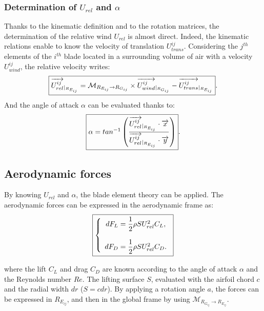 \subsubsection*{Determination of $U_{rel}$ and $\alpha$}
Thanks to the kinematic definition and to the rotation matrices, the determination of the relative wind $U_{rel}$ is almost direct. Indeed, the kinematic relations enable to know the velocity of translation $U^{ij}_{trans}$. Considering the $j^{th}$ elements of the $i^{th}$ blade located in a surrounding volume of air with a velocity $U^{ij}_{wind}$, the relative velocity writes:
\begin{equation}
\label{eq:AL_urel}
\fbox{$
\overrightarrow{U^{ij}_{rel}}_{\vert _{R_{E_{ij}}}} = \mathcal{M}_{R_{E_{ij}} \rightarrow R_{G_{ij}}} \times \overrightarrow{U^{ij}_{wind}}_{\vert _{R_{G_{ij}}}} - \overrightarrow{U^{ij}_{trans}}_{\vert _{R_{E_{ij}}}}
$}.
\end{equation}
And the angle of attack $\alpha$ can be evaluated thanks to:
\begin{equation}
\label{eq:AL_alpha}
\fbox{$
\alpha = tan^{-1} \left( \dfrac{\overrightarrow{U^{ij}_{rel}}_{\vert _{R_{E_{ij}}}} \cdot \overrightarrow{x}}{\overrightarrow{U^{ij}_{rel}}_{\vert _{R_{E_{ij}}}} \cdot \overrightarrow{y}} \right)
$}.
\end{equation}

\subsection*{Aerodynamic forces}
By knowing $U_{rel}$ and $\alpha$, the blade element theory can be applied. The aerodynamic forces can be expressed in the aerodynamic frame as:
\begin{equation}
\label{eq:eol_m_alm_eff}	
\fbox{$
\left\lbrace
\begin{array}{ccc}	
dF_{L} = \dfrac{1}{2} \rho S U_{rel}^2 C_L,
\\   
\\
dF_{D} = \dfrac{1}{2} \rho S U_{rel}^2 C_D.
\\
\end{array}\right.
$}
\end{equation}	

where the lift $C_L$ and drag $C_D$ are known according to the angle of attack $\alpha$ and the Reynolds number $Re$. The lifting surface $S$, evaluated with the airfoil chord $c$ and the radial width $dr$ ($S = c dr$). By applying a rotation angle $a$, the forces can be expressed in $R_{E_{ij}}$, and then in the global frame by using $\mathcal{M}_{R_{G_{ij}} \rightarrow R_{E_{ij}}}$.


